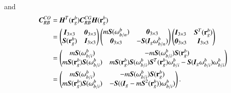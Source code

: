 and
\begin{align}
\emph{\textbf{C}}^{CO}_{RB} &=
\emph{\textbf{H}}^{T}(\vec{r}^{b}_{g})\emph{\textbf{C}}_{RB}^{CG}\emph{\textbf{H}}(\vec{r}^{b}_{g}) \nonumber \\
&=
\begin{pmatrix}
\emph{\textbf{I}}_{3\times 3}&\emph{\textbf{0}}_{3\times 3} \\
\emph{\textbf{S}}(\vec{r}^{b}_{g})
&\emph{\textbf{I}}_{3\times 3}
\end{pmatrix}
\begin{pmatrix}
m\emph{\textbf{S}}(\vec{\omega}^{b}_{b/n})&\emph{\textbf{0}}_{3\times 3} \\
\emph{\textbf{0}}_{3\times 3}&-\emph{\textbf{S}}(\emph{\textbf{I}}_{g}\vec{\omega}^{b}_{b/n})
\end{pmatrix}
\begin{pmatrix}
\emph{\textbf{I}}_{3\times 3}& \emph{\textbf{S}}^{T}(\vec{r}^{b}_{g})\\
\emph{\textbf{0}}_{3\times 3}
&\emph{\textbf{I}}_{3\times 3}
\end{pmatrix} \nonumber \\
&=
\begin{pmatrix}
m\emph{\textbf{S}}(\vec{\omega}^{b}_{b/i})&-m\emph{\textbf{S}}(\vec{\omega}_{b/i}^{b})\emph{\textbf{S}}(\vec{r}_{g}^{b}) \\
m\emph{\textbf{S}}(\vec{r}_{g}^{b})\emph{\textbf{S}}(\vec{\omega}_{b/i}^{b})&
m\emph{\textbf{S}}(\vec{r}_{g}^{b})\emph{\textbf{S}}(\vec{\omega}_{b/i}^{b})
\emph{\textbf{S}}^{T}(\vec{r}_{g}^{b})\vec{\omega}^{b}_{b/i}-
\emph{\textbf{S}}(\emph{\textbf{I}}_{g}\vec{\omega}^{b}_{b/i})\vec{\omega}^{b}_{b/i}
\end{pmatrix} \nonumber \\
&=
\begin{pmatrix}
m\emph{\textbf{S}}(\vec{\omega}^{b}_{b/i})&-m\emph{\textbf{S}}(\vec{\omega}_{b/i}^{b})\emph{\textbf{S}}(\vec{r}_{g}^{b}) \\
m\emph{\textbf{S}}(\vec{r}_{g}^{b})\emph{\textbf{S}}(\vec{\omega}_{b/i}^{b})&
-\emph{\textbf{S}}((\emph{\textbf{I}}_{g}-m\emph{\textbf{S}}^{2}(\vec{r}^{b}_{g}))\vec{\omega}^{b}_{b/i})
\end{pmatrix}. \label{EQ:CRBCO}                   
\end{align}


